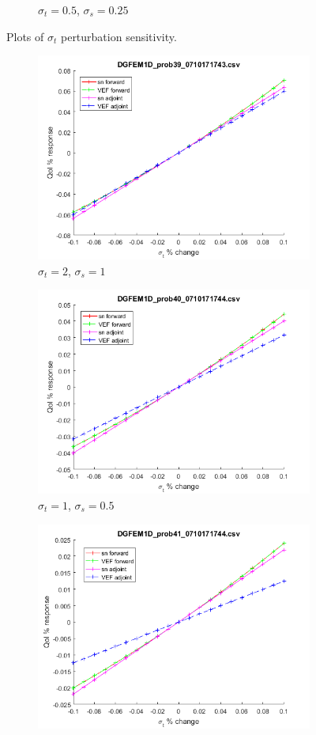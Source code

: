 \documentclass{article}
\newcommand{\sigt}{\sigma_t}
\newcommand{\sigs}{\sigma_s}
\begin{document}
\begin{figure}[H]
\begin{subfigure}{.5\textwidth}
  \caption{$\sigt=0.5$, $\sigs=0.25$}
  \label{fig:sfig3}
\end{subfigure}
\caption{Plots of $\sigt$ perturbation sensitivity.}
\label{fig:fig}
\end{figure}

\begin{figure}[H]
\label{InHomoPerts}
\begin{subfigure}{.5\textwidth}
  \centering
  \includegraphics[width=.8\linewidth]{figures/39sigsSens.png}
  \caption{$\sigt=2$, $\sigs=1$}
  \label{fig:sfig1}
\end{subfigure}%
\begin{subfigure}{.5\textwidth}
  \centering
  \includegraphics[width=.8\linewidth]{figures/40sigsSens.png}
  \caption{$\sigt=1$, $\sigs=0.5$}
  \label{fig:sfig2}
\end{subfigure}
\begin{subfigure}{.5\textwidth}
  \centering
  \includegraphics[width=.8\linewidth]{figures/41sigsSens.png}

\end{subfigure}
\end{figure}
\end{document}
